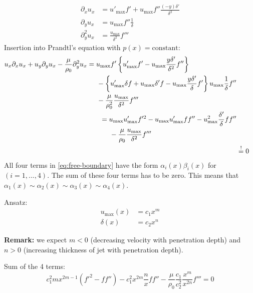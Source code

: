 \begin{align}
\partial_xu_x &= u'_\mathrm{max}f'+u_\mathrm{max}f''\frac{(-y)\delta'}{\delta^2} \\
\partial_yu_x &= u_\mathrm{max} f''\frac{1}{\delta}\\
\partial^2_yu_x &= \frac{u_\mathrm{max}}{\delta^2}f'''
\end{align}
Insertion into Prandtl's equation with $p(x)=\text{constant}$:
\begin{align}
\begin{split}
u_x\partial_x u_x+u_y\partial_yu_x-\frac{\mu}{\rho_0}\partial^2_yu_x &= u_\mathrm{max}f'\left\lbrace u'_\mathrm{max}f' - u_\mathrm{max}\frac{y\delta'}{\delta^2}f''\right\rbrace \\
&\hspace{5mm}-\left\lbrace u'_\mathrm{max}\delta f + u_\mathrm{max}\delta'f-u_\mathrm{max}\frac{y\delta'}{\delta}f'\right\rbrace u_\mathrm{max}\frac{1}{\delta}f'' \\
&\hspace{5mm}-\frac{\mu}{\rho_0^2} \frac{u_\mathrm{max}}{\delta^2}f'''
\end{split}\\
\begin{split}
&= u_\mathrm{max}u'_\mathrm{max}f'^2-u_\mathrm{max}u'_\mathrm{max}ff''-u_\mathrm{max}^2\frac{\delta'}{\delta}ff'' \\
&\hspace{5mm}-\frac{\mu}{\rho_0}\frac{u_\mathrm{max}}{\delta^2}f'''\label{eq:free-boundary}
\end{split} \\
&\overset{!}{=}0 \label{eq:prandtl}
\end{align}
All four terms in \eqref{eq:free-boundary} have the form $\alpha_i(x)\beta_i(x)$ for $(i=1,...,4)$. The sum of these four terms has to be zero. This means that $\alpha_1(x)\sim\alpha_2(x)\sim\alpha_3(x)\sim\alpha_4(x)$.

Ansatz:
\begin{align}
u_\mathrm{max}(x) &= c_1x^m\\
\delta(x) &= c_2 x^n
\end{align}

\begin{framed}
\textbf{Remark:} we expect $m<0$ (decreasing velocity with penetration depth) and $n>0$ (increasing thickness of jet with penetration depth).
\end{framed}

Sum of the 4 terms:
\begin{equation}
c_1^2mx^{2m-1}(f'^2-ff'')-c_1^2x^{2m}\frac{n}{x}ff'' - \frac{\mu}{\rho_0}\frac{c_1}{c_2^2}\frac{x^m}{x^{2n}}f'''=0
\end{equation}

